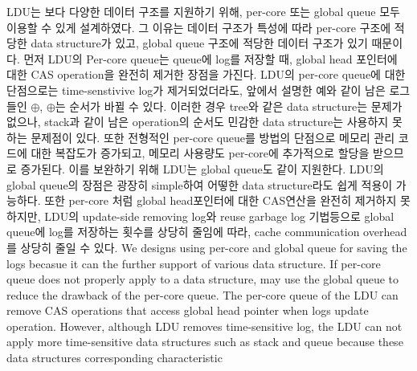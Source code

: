 \ifkor
LDU는 보다 다양한 데이터 구조를 지원하기 위해, per-core 또는 global queue 모두 이용할 수 있게 설계하였다.
그 이유는 데이터 구조가 특성에 따라 per-core 구조에 적당한 data structure가 있고,
global queue 구조에 적당한 데이터 구조가 있기 때문이다.
먼저 LDU의 Per-core queue는 queue에 log를 저장할 때, global head 포인터에 대한 CAS operation을
완전히 제거한 장점을 가진다.
LDU의 per-core queue에 대한 단점으로는 time-senstivive log가 제거되었더라도,
앞에서 설명한 예와 같이 남은 로그들인 $\oplus$, $\oplus$는 순서가 바뀔 수 있다.
이러한 경우 tree와 같은 data structure는 문제가 없으나, stack과 같이 남은 operation의
순서도 민감한 data structure는 사용하지 못하는 문제점이 있다.
또한 전형적인 per-core queue를 방법의 단점으로 메모리 관리 코드에 대한 복잡도가 증가되고, 
메모리 사용량도 per-core에 추가적으로 할당을 받으므로 증가된다.
이를 보완하기 위해 LDU는 global queue도 같이 지원한다.
LDU의 global queue의 장점은 광장히 simple하여 어떻한 data structure라도 쉽게 적용이 가능하다.
또한 per-core 처럼 global head포인터에 대한 CAS연산을 완전히 제거하지 못하지만, LDU의 update-side
removing log와 reuse garbage log 기법등으로 global queue에 log를 저장하는 횟수를 상당히 줄임에 따라,
cache communication overhead를 상당히 줄일 수 있다.
\else
We designs using per-core and global queue for saving the logs becasue it
can the further support of various data structure.
If per-core queue does not properly apply to a data structure, may use the
global queue to reduce the drawback of the per-core queue.
The per-core queue of the LDU can remove CAS operations that access global head
pointer when logs update operation. 
However, although LDU removes time-sensitive log, the LDU can not apply more
time-sensitive data structures such as stack and queue because these data
structures corresponding characteristic

